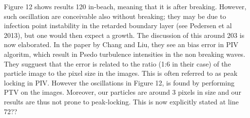 \documentclass[11pt]{article}
\begin{document}
Figure 12 shows results 120 in-beach, meaning that it is after breaking. However, such oscillation are conceivable
also without breaking; they may be due to infection point instability in the retarded boundary layer (see Pedersen et al 2013), but one would then expect a growth. The discussion of this around 203 is now elaborated. 
 In the paper by Chang and Liu, they see an bias error in PIV algoritm, which result in Psedo turbulence intensities in the non breaking waves. They sugguest that the error is related to the ratio (1:6 in their case) of the particle image to the pixel size in the images. This is often referred to as peak locking in PIV. However the oscillations in Figure 12, is found by  performing PTV on the images. Moreover, our particles are around 3 pixels in size and
our results are thus not prone to peak-locking. This is now explicitly stated
at line 72?? 
\end{document}
